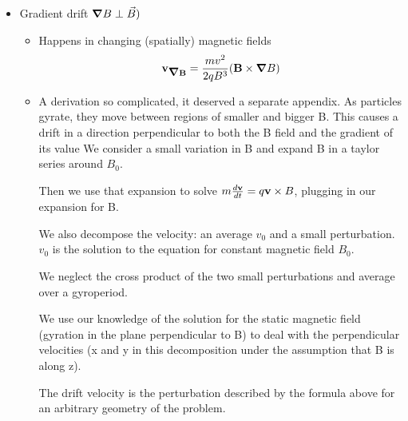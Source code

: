 \begin{itemize}
		\item Gradient drift $\mbox{\boldmath$ \nabla $} B \perp \vec{B})$
		\begin{itemize}
		\item	Happens in changing (spatially) magnetic fields
		\[\mathbf{v_{\mbox{\boldmath$ \nabla $} B}} = \frac{m v^2}{2 q B^3} (\mathbf{B} \times {\ensuremath{\mbox{\boldmath$ \nabla $}} B} ) \]
			\item A derivation so complicated, it deserved a separate appendix.
			As particles gyrate, they move between regions of smaller and bigger B.
			This causes a drift in a direction perpendicular to both the B field and the gradient of its value
			We consider a small variation in B and expand B in a taylor series around $B_0$.
			
			Then we use that expansion to solve $m \frac{d \mathbf{v}}{d t} = q {\mathbf{v} \times {B}}$, plugging in our expansion for B.
			
			We also decompose the velocity: an average $v_{0}$ and a small perturbation. $v_{0}$ is the solution to the equation for constant magnetic field $B_{0}$.
			
			We neglect the cross product of the two small perturbations and average over a gyroperiod.
			
			We use our knowledge of the solution for the static magnetic field (gyration in the plane perpendicular to B) to deal with the perpendicular velocities (x and y in this decomposition under the assumption that B is along z).
			
			The drift velocity is the perturbation described by the formula above for an arbitrary geometry of the problem.
		\end{itemize}
	\end{itemize}
	
	
